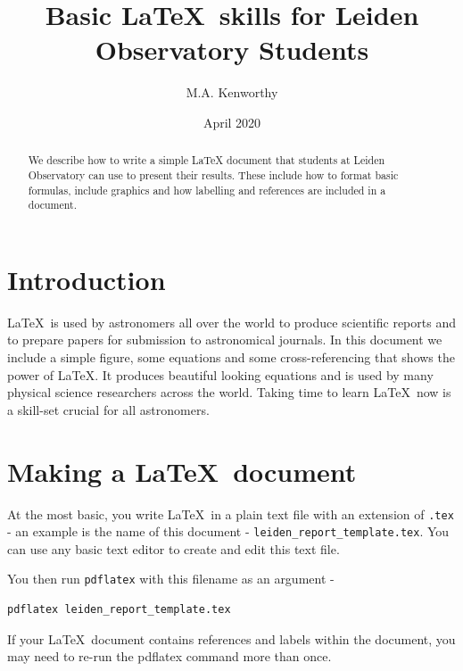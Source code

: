 \documentclass[a4,modern]{aastex63}
\begin{document}
\title{Basic \LaTeX\ skills for Leiden Observatory Students}

\author[0000-0002-7064-8270]{M.A. Kenworthy}


\date{April 2020}

\begin{abstract}

We describe how to write a simple LaTeX document that students at Leiden Observatory can use to present their results.
%
These include how to format basic formulas, include graphics and how labelling and references are included in a document.

\end{abstract}

\section{Introduction}

\LaTeX\ is used by astronomers all over the world to produce scientific reports and to
prepare papers for submission to astronomical journals.
%
In this document we include a simple figure, some equations and some cross-referencing that shows
the power of \LaTeX.
%
It produces beautiful looking equations and is used by many physical science researchers across the world.
%
Taking time to learn \LaTeX\ now is a skill-set crucial for all astronomers.

\section{Making a \LaTeX\ document}

At the most basic, you write \LaTeX\ in a plain text file with an extension of \verb=.tex= - an example is the name of this document - \verb=leiden_report_template.tex=.
%
You can use any basic text editor to create and edit this text file.

You then run \verb=pdflatex= with this filename as an argument - 

\begin{verbatim}
pdflatex leiden_report_template.tex
\end{verbatim}

If your \LaTeX\ document contains references and labels within the document, you
may need to re-run the pdflatex command more than once.
\end{document}
